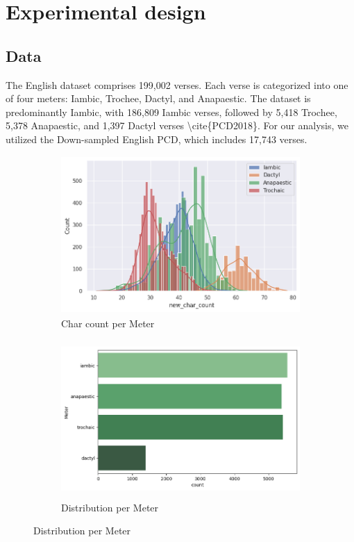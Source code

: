 \documentclass{article}
\begin{document}
\section{Experimental design}
\label{sec:headings}



\subsection{Data}

The English dataset comprises 199,002 verses. Each verse is categorized into one of four meters: Iambic, Trochee, Dactyl, and Anapaestic. The dataset is predominantly Iambic, with 186,809 Iambic verses, followed by 5,418 Trochee, 5,378 Anapaestic, and 1,397 Dactyl verses \textbackslash{}cite\{PCD2018\}. For our analysis, we utilized the Down-sampled English PCD, which includes 17,743 verses. \href{https://www.kaggle.com/datasets/mohamedkhaledelsafty/english-poem-comprehensive-dataset-apcd?select=Down-sampled+English+PCD.csv}{}

\begin{figure}[h!] 
\begin{subfigure}{0.5\textwidth}
\includegraphics[width=0.9\linewidth, height=6cm]{images/word_char.png} 
\centering
\caption{Char count per Meter}
\label{fig:sub}
\end{subfigure}
\begin{subfigure}{0.5\textwidth}
\includegraphics[width=0.9\linewidth, height=6cm]{images/D-EPCD.png} 
\centering
\caption{Distribution per Meter}
\label{fig:distribution}
\end{subfigure}
    
\end{figure}
\end{document}
